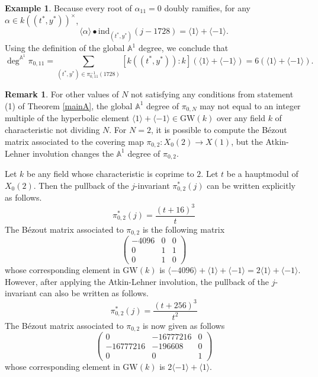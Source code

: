 \documentclass[12pt, reqno]{amsart}
\theoremstyle{definition}
\newtheorem{remark}[theorem]{Remark}
\newtheorem{example}[theorem]{Example}
\newcommand{\A}{\mathbb{A}} %
\newcommand{\GW}{\mathrm{GW}} %
\newcommand{\Adeg}{\deg^{\mathbb{A}^1}} %
\newcommand{\ind}{\mathrm{ind}} %
\begin{document}
\begin{example}
Because every root of $\alpha_{11} = 0$ doubly ramifies, for any $\alpha \in k((t^*, y^*))^\times$,
\begin{equation*}
    \langle \alpha \rangle \bullet \ind_{(t^*, y^*)} (j-1728) = \langle 1 \rangle + \langle -1 \rangle.
\end{equation*}
Using the definition of the global $\A^1$ degree, we conclude that
\begin{equation*}
    \Adeg \pi_{0, 11} = \sum_{(t^*, y^*) \in \pi_{0, 11}^{-1}(1728)} [k((t^*,y^*)) : k](\langle 1 \rangle + \langle -1 \rangle) = 6(\langle 1 \rangle + \langle -1 \rangle).
\end{equation*}

\end{example}

\begin{remark}\label{nonex1}
For other values of $N$ not satisfying any conditions from statement (1) of Theorem \ref{mainA}, the global $\A^1$ degree of $\pi_{0,N}$ may not equal to an integer multiple of the hyperbolic element $\langle 1 \rangle + \langle -1 \rangle \in \GW(k)$ over any field $k$ of characteristic not dividing $N$. 
For $N = 2$, it is possible to compute the B\'ezout matrix associated to the covering map $\pi_{0,2}:X_0(2) \to X(1)$, but the Atkin-Lehner involution changes the $\A^1$ degree of $\pi_{0,2}$.

Let $k$ be any field whose characteristic is coprime to $2$. Let $t$ be a hauptmodul of $X_0(2)$. Then the pullback of the $j$-invariant $\pi_{0,2}^{*}(j)$ can be written explicitly as follows.
\begin{equation*}
    \pi_{0,2}^*(j) = \frac{(t + 16)^3}{t}
\end{equation*}
The B\'ezout matrix associated to $\pi_{0,2}$ is the following matrix
\begin{equation*}
    \begin{pmatrix} -4096 & 0 & 0 \\ 0 & 1 & 1 \\ 0 & 1 & 0 \end{pmatrix}
\end{equation*}
whose corresponding element in $\GW(k)$ is $\langle -4096 \rangle + \langle 1 \rangle + \langle -1 \rangle = 2 \langle 1 \rangle + \langle -1 \rangle$. However, after applying the Atkin-Lehner involution, the pullback of the $j$-invariant can also be written as follows.
\begin{equation*}
    \pi_{0,2}^*(j) = \frac{(t+256)^3}{t^2}
\end{equation*}
The B\'ezout matrix associated to $\pi_{0,2}$ is now given as follows
\begin{equation*}
    \begin{pmatrix} 0 & -16777216 & 0 \\ -16777216 & -196608 & 0 \\ 0 & 0 & 1 \end{pmatrix}
\end{equation*}
whose corresponding element in $\GW(k)$ is $2\langle -1 \rangle + \langle 1 \rangle$. 


\end{remark}
\end{document}
